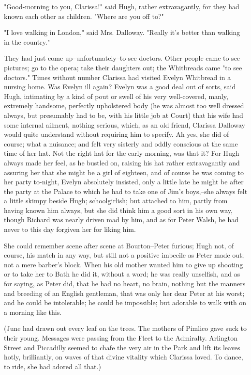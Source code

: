 \documentclass[lang=cn,10pt]{elegantbook}
\begin{document}
"Good-morning to you, Clarissa!" said Hugh, rather extravagantly,
for they had known each other as children.  "Where are you off to?"

"I love walking in London," said Mrs. Dalloway.  "Really it's
better than walking in the country."

They had just come up--unfortunately--to see doctors.  Other people
came to see pictures; go to the opera; take their daughters out;
the Whitbreads came "to see doctors."  Times without number
Clarissa had visited Evelyn Whitbread in a nursing home.  Was
Evelyn ill again?  Evelyn was a good deal out of sorts, said Hugh,
intimating by a kind of pout or swell of his very well-covered,
manly, extremely handsome, perfectly upholstered body (he was
almost too well dressed always, but presumably had to be, with his
little job at Court) that his wife had some internal ailment,
nothing serious, which, as an old friend, Clarissa Dalloway would
quite understand without requiring him to specify.  Ah yes, she did
of course; what a nuisance; and felt very sisterly and oddly
conscious at the same time of her hat.  Not the right hat for the
early morning, was that it?  For Hugh always made her feel, as he
bustled on, raising his hat rather extravagantly and assuring her
that she might be a girl of eighteen, and of course he was coming
to her party to-night, Evelyn absolutely insisted, only a little
late he might be after the party at the Palace to which he had to
take one of Jim's boys,--she always felt a little skimpy beside
Hugh; schoolgirlish; but attached to him, partly from having known
him always, but she did think him a good sort in his own way,
though Richard was nearly driven mad by him, and as for Peter
Walsh, he had never to this day forgiven her for liking him.

She could remember scene after scene at Bourton--Peter furious;
Hugh not, of course, his match in any way, but still not a positive
imbecile as Peter made out; not a mere barber's block.  When his
old mother wanted him to give up shooting or to take her to Bath he
did it, without a word; he was really unselfish, and as for saying,
as Peter did, that he had no heart, no brain, nothing but the
manners and breeding of an English gentleman, that was only her
dear Peter at his worst; and he could be intolerable; he could be
impossible; but adorable to walk with on a morning like this.

(June had drawn out every leaf on the trees.  The mothers of
Pimlico gave suck to their young.  Messages were passing from the
Fleet to the Admiralty.  Arlington Street and Piccadilly seemed to
chafe the very air in the Park and lift its leaves hotly,
brilliantly, on waves of that divine vitality which Clarissa loved.
To dance, to ride, she had adored all that.)
\end{document}
